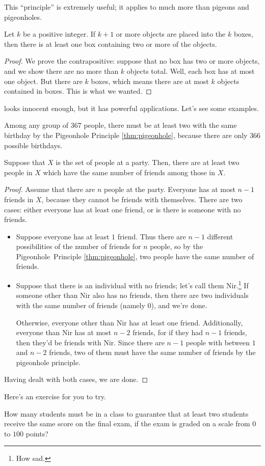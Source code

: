 \documentclass[../notes.tex]{subfiles}
\begin{document}
This ``principle'' is extremely useful; it applies to much more than pigeons and pigeonholes.
\begin{theorem} \label{thm:pigeonhole}
    Let $k$ be a positive integer. If $k + 1$ or more objects are placed into the $k$ boxes, then there is at least one box containing two or more of the objects.
\end{theorem}
\begin{proof}
    We prove the contrapositive: suppose that no box has two or more objects, and we show there are no more than $k$ objects total. Well, each box has at most one object. But there are $k$ boxes, which means there are at most $k$ objects contained in boxes. This is what we wanted.
\end{proof}
 looks innocent enough, but it has powerful applications. Let's see some examples.
\begin{example}
    Among any group of $367$ people, there must be at least two with the same birthday by the Pigeonhole Principle \ref{thm:pigeonhole}, because there are only $366$ possible birthdays.
\end{example}
\begin{exe}
    Suppose that $X$ is the set of people at a party.  Then, there are at least two people in $X$ which have the same number of friends among those in $X$.
\end{exe}
\begin{proof}
    Assume that there are $n$ people at the party. Everyone has at most $n - 1$ friends in $X$, because they cannot be friends with themselves. There are two cases: either everyone has at least one friend, or is there is someone with no friends.
    \begin{itemize}
        \item Suppose everyone has at least $1$ friend. Thus there are $n - 1$ different possibilities of the number of friends for $n$ people, so by the Pigeonhole~Principle \ref{thm:pigeonhole}, two people have the same number of friends.
        \item Suppose that there is an individual with no friends; let's call them Nir.\footnote{How sad.} If someone other than Nir also has no friends, then there are two individuals with the same number of friends (namely $0$), and we're done.
        
        Otherwise, everyone other than Nir has at least one friend. Additionally, everyone than Nir has at most $n - 2$ friends, for if they had $n - 1$ friends, then they'd be friends with Nir. Since there are $n - 1$ people with between $1$ and $n - 2$ friends, two of them must have the same number of friends by the pigeonhole principle.
    \end{itemize}
    Having dealt with both cases, we are done.
\end{proof}
Here's an exercise for you to try.
\begin{exe}
    How many students must be in a class to guarantee that at least two students receive the same score on the final exam, if the exam is graded on a scale from $0$ to $100$ points?
\end{exe}
\end{document}
